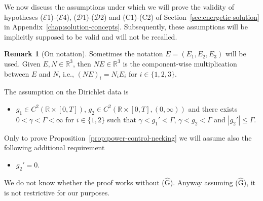 \documentclass[a4paper,10pt,twoside]{amsbook}
\numberwithin{section}{chapter}
\numberwithin{equation}{chapter}
\theoremstyle{definition}
\newtheorem{rmk}[prop]{Remark}
\begin{document}
We now discuss the assumptions under which we will prove the validity of hypotheses ($\mathcal{E}$1)-($\mathcal{E}$4), ($\mathcal{D}$1)-($\mathcal{D}$2) and (C1)-(C2) of Section~\ref{sec:energetic-solution} in Appendix~\ref{chap:solution-concepts}. Subsequently, these assumptions will be implicitly supposed to be valid and will not be recalled.
\begin{rmk}[On notation]
Sometimes the notation $E=(E_1,E_2,E_3)$ will be used. Given $E,N\in\mathbb{R}^3$, then $NE\in\mathbb{R}^3$ is the component-wise multiplication between $E$ and $N$, i.e., $(NE)_i=N_iE_i$ for $i\in\{1,2,3\}$.
\end{rmk}

The assumption on the Dirichlet data is
\begin{itemize}[itemsep=1em]
\item[(G)] $g_1\in C^2(\mathbb{R}\times[0,T])$, $g_2\in C^2(\mathbb{R}\times[0,T],(0,\infty))$ and there exists $0<\gamma<\Gamma<\infty$ for $i\in\{1,2\}$ such that $\gamma<g_1'<\Gamma$, $\gamma<g_2<\Gamma$ and $|g_2'|\le\Gamma$.
\end{itemize}
Only to prove Proposition~\ref{prop:power-control-necking} we will assume also the following additional requirement
\begin{itemize}
\item[($\hat{\text{G}}$)] $g_2'=0$.
\end{itemize}
We do not know whether the proof works without ($\hat{\text{G}}$). Anyway assuming ($\hat{\text{G}}$), it is not restrictive for our purposes.
\end{document}
